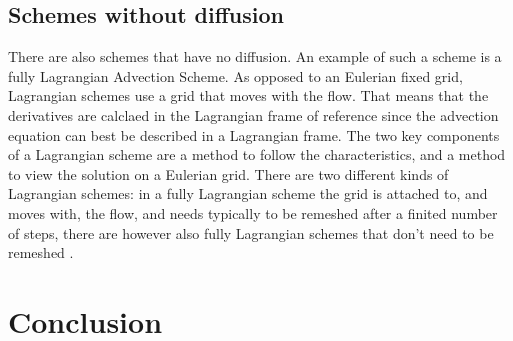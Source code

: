 \documentclass[10pt, a4paper]{article}
\begin{document}
\subsection{Schemes without diffusion}
There are also schemes that have no diffusion. An example of such a scheme is a fully Lagrangian Advection Scheme. As opposed to an Eulerian fixed grid, Lagrangian schemes use a grid that moves with the flow. That means that the derivatives are calclaed in the Lagrangian frame of reference since the advection equation can best be described in a Lagrangian frame. The two key components of a Lagrangian scheme are a method to follow the characteristics, and a method to view the solution on a Eulerian grid. There are two different kinds of Lagrangian schemes: in a fully Lagrangian scheme the grid is attached to, and moves with, the flow, and needs typically to be remeshed after a finited number of steps, there are however also fully Lagrangian schemes that don't need to be remeshed \cite{nodif}.

\section{Conclusion}








\end{document}

